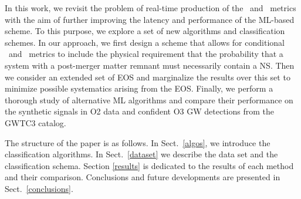 In this work, we revisit the problem of real-time production of the \hasns\ and \hasrem\ metrics with the aim of further improving the latency and performance of the
\ac{ML}-based scheme. To this purpose, we explore a set of new algorithms and classification schemes. In our approach, we first design a scheme that allows for
conditional \hasns\ and \hasrem\ metrics to include the physical requirement that the probability that a system with a post-merger matter remnant must necessarily
contain a \ac{NS}. Then we consider an extended set of \ac{EOS} and marginalize the results over this set to minimize possible systematics arising from the \ac{EOS}.
Finally, we perform a thorough study of alternative \ac{ML} algorithms and compare their performance on the synthetic signals in \ac{O2} data and confident \ac{O3}
\ac{GW} detections from the \ac{GWTC3} catalog.

The structure of the paper is as follows. In Sect.~\ref{algos}, we introduce the classification algorithms. In Sect.~\ref{dataset} we describe the data set and the
classification schema. Section \ref{results} is dedicated to the results of each method and their comparison. Conclusions and future developments are presented in
Sect.~\ref{conclusions}. 
